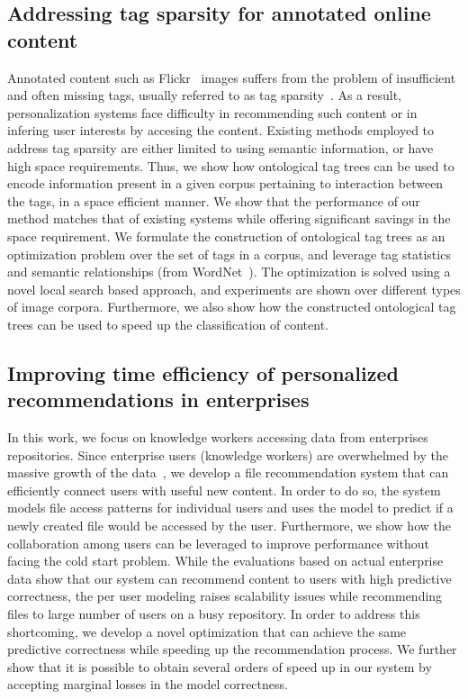 \documentclass[12pt]{ucsddissertation}
\begin{document}

\subsection{Addressing tag sparsity for annotated online content}

Annotated content such as Flickr~\cite{Flickr} images suffers from the problem of insufficient and often missing tags, usually referred to as tag sparsity~\cite{SunLang11,MohdSemantic13}. 
As a result, personalization systems face difficulty in recommending such content or in infering user interests by accesing the content. Existing methods employed to address tag sparsity are either limited to using semantic information, or have high space requirements. Thus, we show how ontological tag trees can be used to encode information present in a given corpus pertaining to interaction between the tags, in a space efficient manner. We show that the performance of our method matches that of existing systems while offering significant savings in the space requirement. We formulate the construction of ontological tag trees as an optimization problem over the set of tags in a corpus, and leverage tag statistics and semantic relationships (from WordNet~\cite{wordnet}). The optimization is solved using a novel local search based approach, and experiments are shown over different types of image corpora. Furthermore, we also show how the constructed ontological tag trees can be used to speed up the classification of content. 


\subsection{Improving time efficiency of personalized recommendations in enterprises}


In this work, we focus on knowledge workers accessing data from enterprises repositories. Since enterprise users (knowledge workers) are overwhelmed by the massive growth of the data~\cite{IDGBigDataSurvey14}, we develop a file recommendation system that can efficiently connect users with useful new content. In order to do so, the system models file access patterns for individual users and uses the model to predict if a newly created file would be accessed by the user. Furthermore, we show how the collaboration among users can be leveraged to improve performance without facing the cold start problem. While the evaluations based on actual enterprise data show that our system can recommend content to users with high predictive correctness, the per user modeling raises scalability issues while recommending files to large number of users on a busy repository. In order to address this shortcoming, we develop a novel optimization that can achieve the same predictive correctness while speeding up the recommendation process. We further show that it is possible to obtain several orders of speed up in our system by accepting marginal losses in the model correctness. 
\end{document}
